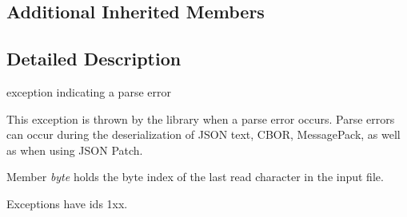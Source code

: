 \subsection*{Additional Inherited Members}


\subsection{Detailed Description}
exception indicating a parse error 

This exception is thrown by the library when a parse error occurs. Parse errors can occur during the deserialization of J\+S\+ON text, C\+B\+OR, Message\+Pack, as well as when using J\+S\+ON Patch.

Member {\itshape byte} holds the byte index of the last read character in the input file.

Exceptions have ids 1xx.

